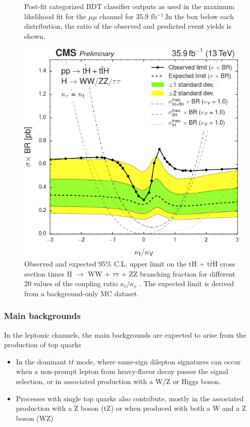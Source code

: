 \documentclass[11pt]{beamer}
\begin{document}
\begin{frame}
\begin{multicols}{2}
\begin{center}
\begin{figure}
		\caption*{\tiny{Post-fit categorized BDT classifier outputs as used in
			the maximum likelihood fit for the $\mu\mu$ channel for
			35.9 fb$^{-1}$.In the box below each distribution, the ratio
			of the observed and predicted event yields is shown.\cite{2}
		 }}
	\end{figure}
\end{center}
\end{multicols}
\end{frame}

\begin{frame}
	\begin{center}
		\begin{figure}
			\includegraphics[scale=0.3]{figures/sc.png}
			\caption{Observed and expected 95$\%$ C.L. upper limit on the tH + t$\bar{t}$H cross section times H $\rightarrow$ WW $+$ $\tau\tau$ $+$ ZZ branching fraction for different 20 values of the coupling ratio $\kappa_t /\kappa_v$ . The expected limit is derived from a background-only MC dataset.}
		\end{figure}
	\end{center}
\end{frame}


\begin{frame}
\frametitle{Main backgrounds}
In the leptonic channels, the main backgrounds are expected to
	arise from the production of top quarks
	\begin{itemize}
	\item In the dominant t$\bar{t}$ mode, where 
 same-sign dilepton signatures can occur when a non-prompt lepton from heavy-flavor
decay passes the signal selection, or in associated production with a W/Z or Higgs boson.
	\item Processes with single top quarks also contribute, mostly in the associated production with a Z
	boson (tZ) or when produced with both a W and a Z boson (WZ) 

\end{itemize}
\end{frame}
\end{document}
